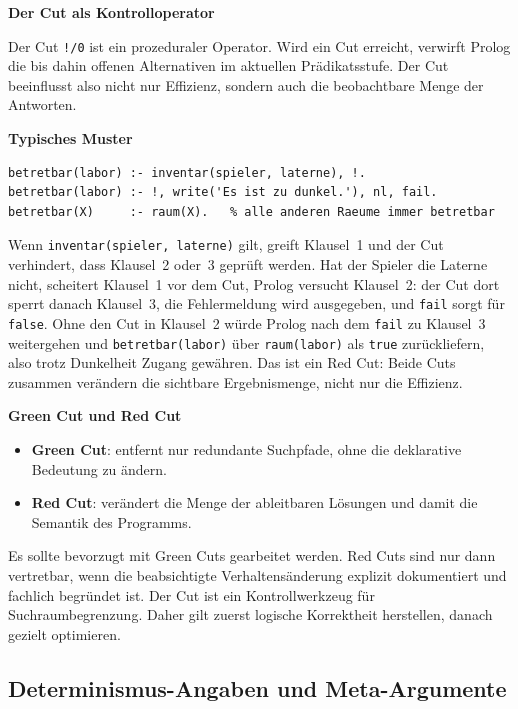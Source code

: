\documentclass[parskip=half,a4paper,11pt]{scrreprt}
\begin{document}
\textbf{Der Cut als Kontrolloperator}

Der Cut \texttt{!/0} ist ein prozeduraler Operator. Wird ein Cut erreicht, verwirft Prolog die bis dahin offenen Alternativen im aktuellen Prädikatsstufe. Der Cut beeinflusst also nicht nur Effizienz, sondern auch die beobachtbare Menge der Antworten.

\textbf{Typisches Muster}
\begin{lstlisting}[caption={}]
% labor ist nur betretbar, wenn die Laterne mitgenommen wurde
betretbar(labor) :- inventar(spieler, laterne), !.
betretbar(labor) :- !, write('Es ist zu dunkel.'), nl, fail.
betretbar(X)     :- raum(X).   % alle anderen Raeume immer betretbar
\end{lstlisting}
Wenn \texttt{inventar(spieler, laterne)} gilt, greift Klausel~1 und der Cut verhindert, dass Klausel~2 oder~3 geprüft werden. Hat der Spieler die Laterne nicht, scheitert Klausel~1 vor dem Cut, Prolog versucht Klausel~2: der Cut dort sperrt danach Klausel~3, die Fehlermeldung wird ausgegeben, und \texttt{fail} sorgt für \texttt{false}. Ohne den Cut in Klausel~2 würde Prolog nach dem \texttt{fail} zu Klausel~3 weitergehen und \texttt{betretbar(labor)} über \texttt{raum(labor)} als \texttt{true} zurückliefern, also trotz Dunkelheit Zugang gewähren. Das ist ein Red Cut: Beide Cuts zusammen verändern die sichtbare Ergebnismenge, nicht nur die Effizienz.

\textbf{Green Cut und Red Cut}

\begin{itemize}
    \item \textbf{Green Cut}: entfernt nur redundante Suchpfade, ohne die deklarative Bedeutung zu ändern.
    \item \textbf{Red Cut}: verändert die Menge der ableitbaren Lösungen und damit die Semantik des Programms.
\end{itemize}

Es sollte bevorzugt mit Green Cuts gearbeitet werden. Red Cuts sind nur dann vertretbar, wenn die beabsichtigte Verhaltensänderung explizit dokumentiert und fachlich begründet ist. Der Cut ist ein Kontrollwerkzeug für Suchraumbegrenzung. Daher gilt zuerst logische Korrektheit herstellen, danach gezielt optimieren.

\subsection{Determinismus-Angaben und Meta-Argumente}
\end{document}
